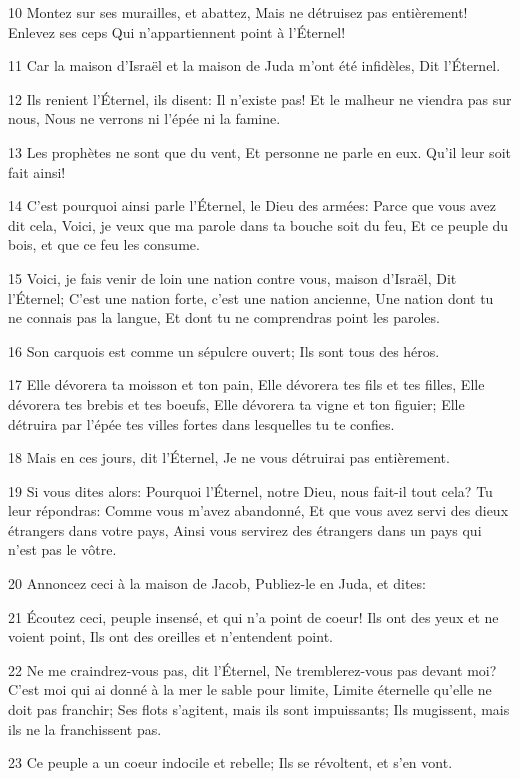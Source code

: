 \par 10 Montez sur ses murailles, et abattez, Mais ne détruisez pas entièrement! Enlevez ses ceps Qui n'appartiennent point à l'Éternel!
\par 11 Car la maison d'Israël et la maison de Juda m'ont été infidèles, Dit l'Éternel.
\par 12 Ils renient l'Éternel, ils disent: Il n'existe pas! Et le malheur ne viendra pas sur nous, Nous ne verrons ni l'épée ni la famine.
\par 13 Les prophètes ne sont que du vent, Et personne ne parle en eux. Qu'il leur soit fait ainsi!
\par 14 C'est pourquoi ainsi parle l'Éternel, le Dieu des armées: Parce que vous avez dit cela, Voici, je veux que ma parole dans ta bouche soit du feu, Et ce peuple du bois, et que ce feu les consume.
\par 15 Voici, je fais venir de loin une nation contre vous, maison d'Israël, Dit l'Éternel; C'est une nation forte, c'est une nation ancienne, Une nation dont tu ne connais pas la langue, Et dont tu ne comprendras point les paroles.
\par 16 Son carquois est comme un sépulcre ouvert; Ils sont tous des héros.
\par 17 Elle dévorera ta moisson et ton pain, Elle dévorera tes fils et tes filles, Elle dévorera tes brebis et tes boeufs, Elle dévorera ta vigne et ton figuier; Elle détruira par l'épée tes villes fortes dans lesquelles tu te confies.
\par 18 Mais en ces jours, dit l'Éternel, Je ne vous détruirai pas entièrement.
\par 19 Si vous dites alors: Pourquoi l'Éternel, notre Dieu, nous fait-il tout cela? Tu leur répondras: Comme vous m'avez abandonné, Et que vous avez servi des dieux étrangers dans votre pays, Ainsi vous servirez des étrangers dans un pays qui n'est pas le vôtre.
\par 20 Annoncez ceci à la maison de Jacob, Publiez-le en Juda, et dites:
\par 21 Écoutez ceci, peuple insensé, et qui n'a point de coeur! Ils ont des yeux et ne voient point, Ils ont des oreilles et n'entendent point.
\par 22 Ne me craindrez-vous pas, dit l'Éternel, Ne tremblerez-vous pas devant moi? C'est moi qui ai donné à la mer le sable pour limite, Limite éternelle qu'elle ne doit pas franchir; Ses flots s'agitent, mais ils sont impuissants; Ils mugissent, mais ils ne la franchissent pas.
\par 23 Ce peuple a un coeur indocile et rebelle; Ils se révoltent, et s'en vont.
